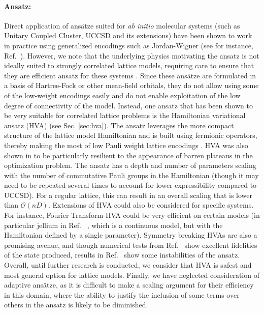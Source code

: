 \paragraph{Ansatz:} Direct application of ans{\"{a}}tze suited for \textit{ab initio} molecular systems (such as Unitary Coupled Cluster, UCCSD and its extensions) have been shown to work in practice using generalized encodings such as Jordan-Wigner (see for instance, Ref.~\cite{Sokolov2020}). However, we note that the underlying physics motivating the ansatz is not ideally suited to strongly correlated lattice models, requiring care to ensure that they are efficient ansatz for these systems \cite{Evangelista2019}. Since these ans\"atze are formulated in a basis of Hartree-Fock or other mean-field orbitals, they do not allow using some of the low-weight encodings easily and do not enable exploitation of the low degree of connectivity of the model. Instead, one ansatz that has been shown to be very suitable for correlated lattice problems is the Hamiltonian variational ansatz (HVA) \cite{Wecker2015, Wiersema2020} (see Sec. \ref{sec:hva}). The ansatz leverages the more compact structure of the lattice model Hamiltonian and is built using fermionic operators, thereby making the most of low Pauli weight lattice encodings \cite{Setia2018, Setia2019, Derby2021, Derby2021_part2}. HVA was also shown in \cite{Wiersema2020} to be particularly resilient to the appearance of barren plateaus in the optimization problem. The ansatz has a depth and number of parameters scaling with the number of commutative Pauli groups in the Hamiltonian (though it may need to be repeated several times to account for lower expressibility compared to UCCSD). For a regular lattice, this can result in an overall scaling that is lower than $\mathcal{O}(nD)$. Extensions of HVA could also be considered for specific systems. For instance, Fourier Transform-HVA \cite{Babbush2018} could be very efficient on certain models (in particular jellium in Ref.~ \cite{Babbush2018}, which is a continuous model, but with the Hamiltonian defined by a single parameter). Symmetry breaking HVAs \cite{Vogt2020,Choquette2021} are also a promising avenue, and though numerical tests from Ref.~\cite{Choquette2021} show excellent fidelities of the state produced, results in Ref.~\cite{Vogt2020} show some instabilities of the ansatz. Overall, until further research is conducted, we consider that HVA is safest and most general option for lattice models. Finally, we have neglected consideration of adaptive ans{\"{a}}tze, as it is difficult to make a scaling argument for their efficiency in this domain, where the ability to justify the inclusion of some terms over others in the ansatz is likely to be diminished.

